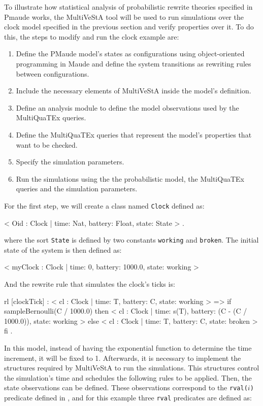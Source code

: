 To illustrate how statistical analysis of probabilistic rewrite theories specified in Pmaude works, the MultiVeStA tool will be used to run simulations over the clock model specified in the previous section and verify properties over it. To do this, the steps to modify and run the clock example are:
\begin{enumerate}
    \item Define the PMaude model's states as configurations using object-oriented programming in Maude and define the system transitions as rewriting rules between configurations.
    \item Include the necessary elements of MultiVeStA inside the model's definition.
    \item Define an analysis module to define the model observations used by the MultiQuaTEx queries.
    \item Define the MultiQuaTEx queries that represent the model's properties that want to be checked.
    \item Specify the simulation parameters.
    \item Run the simulations using the the probabilistic model, the MultiQuaTEx queries and the simulation parameters.
\end{enumerate} 
For the first step, we will create a class named \texttt{Clock} defined as:
\\
\begin{maude}
< Oid : Clock | time: Nat, battery: Float, state: State > .
\end{maude}
where the sort \texttt{State} is defined by two constants \texttt{working} and \texttt{broken}. The initial state of the system is then defined as:
\\
\begin{maude}
< myClock : Clock  | time: 0, battery: 1000.0, state: working >
\end{maude}
And the rewrite rule that simulates the clock's ticks is:
\\
\begin{maude}
rl [clockTick] :
    < cl : Clock  | time: T, battery: C, state: working > 
  =>
    if sampleBernoulli(C / 1000.0) then
      < cl : Clock  | time: s(T), battery: (C - (C / 1000.0)),
        state: working >
    else
      < cl : Clock  | time: T, battery: C, state: broken >
    fi .
\end{maude}
In this model, instead of having the exponential function to determine the time increment, it will be fixed to 1. Afterwards, it is necessary to implement the structures required by MultiVeStA to run the simulations. This structures control the simulation's time and schedules the following rules to be applied. Then, the state observations can be defined. These observations correspond to the \texttt{rval($i$)} predicate defined in \cite{Agha2006,multivesta}, and for this example three \texttt{rval} predicates are defined as:
